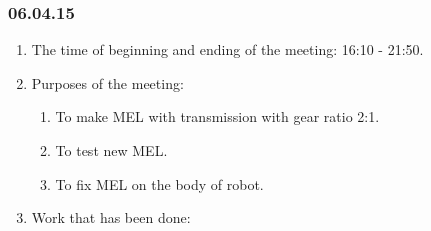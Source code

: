 \subsubsection{06.04.15}
\begin{enumerate}
	
	\item The time of beginning and ending of the meeting: 16:10 - 21:50.
	
	\item Purposes of the meeting: 
	\begin{enumerate}
		
		\item To make MEL with transmission with gear ratio 2:1.
		
		\item To test new MEL.
		
        \item To fix MEL on the body of robot.
		
	\end{enumerate}

	\item Work that has been done:
	\begin{enumerate}
		

\end{enumerate}
\end{enumerate}
